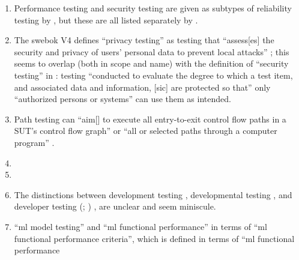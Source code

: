 \begin{enumerate}
    \item %
          Performance testing and security testing are given as subtypes of
          reliability testing by \citep{ISO_IEC2023a}, but these are all listed
          separately by \citep[p.~53]{Firesmith2015}.
    \item %
          The \acs{swebok} V4 defines ``privacy testing'' as testing that
          ``assess[es] the security and privacy of users' personal data to
          prevent local attacks'' \citep[p.~5-10]{SWEBOK2024}; this seems to
          overlap (both in scope and name) with the definition of ``security
          testing'' in \citep[p.~7]{IEEE2022}: testing
          ``conducted to evaluate the degree to which a test item, and
          associated data and information, [sic] are protected so that'' only
          ``authorized persons or systems'' can use them as intended.
    \item %
          Path testing can ``aim[] to execute all entry-to-exit control flow
          paths in a SUT's control flow graph'' \citep[p.~5-13]{SWEBOK2024} or
          ``all or selected paths through a computer program''
          \citep[p.~316]{IEEE2017}.
    \item %
          \tourDiscrep{}
    \item %
          \alphaDiscrep{}
    \item %
          The distinctions between development testing \citep[p.~136]{IEEE2017},
          developmental testing \citep[p.~30]{Firesmith2015}, and developer
          testing
          \ifnotpaper
              (\citealp[p.~39]{Firesmith2015}; \citealp[p.~11]{Gerrard2000a})
          \else
              \cite[p.~39]{Firesmith2015}, \cite[p.~11]{Gerrard2000a}
          \fi are unclear and seem miniscule.
    \item %
           \citetISTQB{} 
          ``\acf{ml} model testing'' and ``\acs{ml} functional performance''
          in terms of ``\acs{ml} functional performance criteria'',
          which is defined in terms of ``\acs{ml} functional performance

\end{enumerate}
